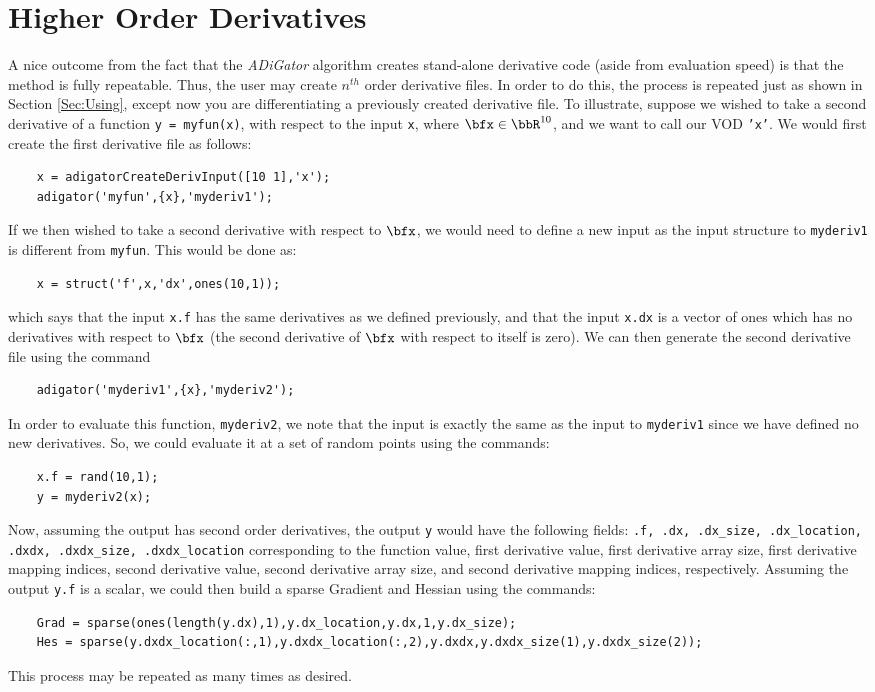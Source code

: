 \documentclass[10pt,pdftex]{article}
\begin{document}
\section{Higher Order Derivatives}
A nice outcome from the fact that the \emph{ADiGator} algorithm creates stand-alone derivative code (aside from evaluation speed) is that the method is fully repeatable. Thus, the user may create $n^{th}$ order derivative files. In order to do this, the process is repeated just as shown in Section \ref{Sec:Using}, except now you are differentiating a previously created derivative file. To illustrate, suppose we wished to take a second derivative of a function \texttt{y = myfun(x)}, with respect to the input \texttt{x}, where $\bfx \in \bbR^{10}$, and we want to call our VOD \texttt{'x'}. We would first create the first derivative file as follows:
\begin{verbatim}
    x = adigatorCreateDerivInput([10 1],'x');
    adigator('myfun',{x},'myderiv1');
\end{verbatim}
If we then wished to take a second derivative with respect to $\bfx$, we would need to define a new input as the input structure to \texttt{myderiv1} is different from \texttt{myfun}. This would be done as:
\begin{verbatim}
    x = struct('f',x,'dx',ones(10,1));
\end{verbatim}
which says that the input \texttt{x.f} has the same derivatives as we defined previously, and that the input \texttt{x.dx} is a vector of ones which has no derivatives with respect to $\bfx$ (the second derivative of $\bfx$ with respect to itself is zero). We can then generate the second derivative file using the command
\begin{verbatim}
    adigator('myderiv1',{x},'myderiv2');
\end{verbatim}
In order to evaluate this function, \texttt{myderiv2}, we note that the input is exactly the same as the input to \texttt{myderiv1} since we have defined no new derivatives. So, we could evaluate it at a set of random points using the commands:
\begin{verbatim}
    x.f = rand(10,1);
    y = myderiv2(x);
\end{verbatim}
Now, assuming the output has second order derivatives, the output \texttt{y} would have the following fields: \texttt{.f, .dx, .dx\_size, .dx\_location, .dxdx, .dxdx\_size, .dxdx\_location} corresponding to the function value, first derivative value, first derivative array size, first derivative mapping indices, second derivative value, second derivative array size, and second derivative mapping indices, respectively. Assuming the output \texttt{y.f} is a scalar, we could then build a sparse Gradient and Hessian using the commands:
\begin{verbatim}
    Grad = sparse(ones(length(y.dx),1),y.dx_location,y.dx,1,y.dx_size);
    Hes = sparse(y.dxdx_location(:,1),y.dxdx_location(:,2),y.dxdx,y.dxdx_size(1),y.dxdx_size(2));
\end{verbatim}
This process may be repeated as many times as desired.
\end{document}
